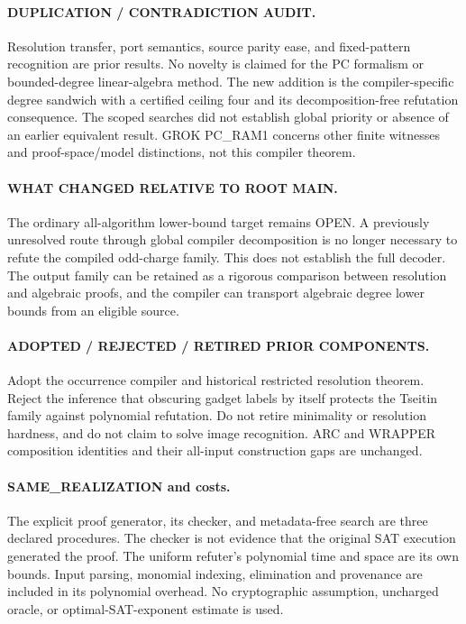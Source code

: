 \documentclass[11pt]{article}
\begin{document}
\paragraph{DUPLICATION / CONTRADICTION AUDIT.}
Resolution transfer, port semantics, source parity ease, and fixed-pattern recognition are prior results. No novelty is claimed for the PC formalism or bounded-degree linear-algebra method. The new addition is the compiler-specific degree sandwich with a certified ceiling four and its decomposition-free refutation consequence. The scoped searches did not establish global priority or absence of an earlier equivalent result. GROK PC\_RAM1 concerns other finite witnesses and proof-space/model distinctions, not this compiler theorem.

\paragraph{WHAT CHANGED RELATIVE TO ROOT MAIN.}
The ordinary all-algorithm lower-bound target remains OPEN. A previously unresolved route through global compiler decomposition is no longer necessary to refute the compiled odd-charge family. This does not establish the full decoder. The output family can be retained as a rigorous comparison between resolution and algebraic proofs, and the compiler can transport algebraic degree lower bounds from an eligible source.

\paragraph{ADOPTED / REJECTED / RETIRED PRIOR COMPONENTS.}
Adopt the occurrence compiler and historical restricted resolution theorem. Reject the inference that obscuring gadget labels by itself protects the Tseitin family against polynomial refutation. Do not retire minimality or resolution hardness, and do not claim to solve image recognition. ARC and WRAPPER composition identities and their all-input construction gaps are unchanged.

\paragraph{SAME\_REALIZATION and costs.}
The explicit proof generator, its checker, and metadata-free search are three declared procedures. The checker is not evidence that the original SAT execution generated the proof. The uniform refuter's polynomial time and space are its own bounds. Input parsing, monomial indexing, elimination and provenance are included in its polynomial overhead. No cryptographic assumption, uncharged oracle, or optimal-SAT-exponent estimate is used.
\end{document}
